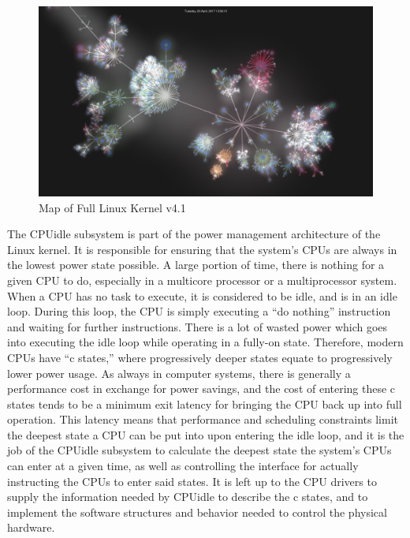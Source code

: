 \documentclass[10pt,preprint]{sigplanconf}
\begin{document}
\begin{figure}[h]
\caption{Map of Full Linux Kernel v4.1}
\centering
\includegraphics[width=\columnwidth]{full_kernel}
\end{figure}

The CPUidle subsystem is part of the power management architecture of the Linux kernel. It is responsible for ensuring that the system’s CPUs are always in the lowest power state possible. A large portion of time, there is nothing for a given CPU to do, especially in a multicore processor or a multiprocessor system. When a CPU has no task to execute, it is considered to be idle, and is in an idle loop. During this loop, the CPU is simply executing a “do nothing” instruction and waiting for further instructions. There is a lot of wasted power which goes into executing the idle loop while operating in a fully-on state. Therefore, modern CPUs have “c states,” where progressively deeper states equate to progressively lower power usage. As always in computer systems, there is generally a performance cost in exchange for power savings, and the cost of entering these c states tends to be a minimum exit latency for bringing the CPU back up into full operation. This latency means that performance and scheduling constraints limit the deepest state a CPU can be put into upon entering the idle loop, and it is the job of the CPUidle subsystem to calculate the deepest state the system's CPUs can enter at a given time, as well as controlling the interface for actually instructing the CPUs to enter said states. It is left up to the CPU drivers to supply the information needed by CPUidle to describe the c states, and to implement the software structures and behavior needed to control the physical hardware. 
\end{document}

